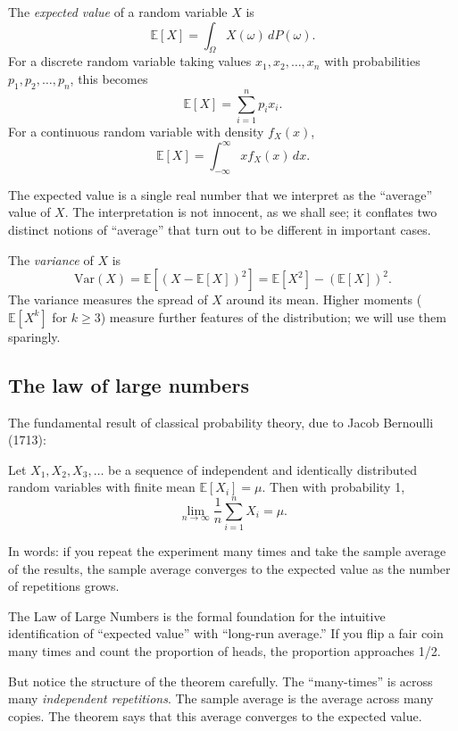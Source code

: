 The \emph{expected value} of a random variable $X$ is
\[
    \mathbb{E}[X] = \int_\Omega X(\omega)\, dP(\omega).
\]
For a discrete random variable taking values $x_1, x_2, \dots, x_n$
with probabilities $p_1, p_2, \dots, p_n$, this becomes
\[
    \mathbb{E}[X] = \sum_{i=1}^n p_i x_i.
\]
For a continuous random variable with density $f_X(x)$,
\[
    \mathbb{E}[X] = \int_{-\infty}^\infty x f_X(x)\, dx.
\]

The expected value is a single real number that we interpret as the
``average'' value of $X$. The interpretation is not innocent, as we
shall see; it conflates two distinct notions of ``average'' that
turn out to be different in important cases.

The \emph{variance} of $X$ is
\[
    \text{Var}(X) = \mathbb{E}[(X - \mathbb{E}[X])^2] =
    \mathbb{E}[X^2] - (\mathbb{E}[X])^2.
\]
The variance measures the spread of $X$ around its mean. Higher
moments ($\mathbb{E}[X^k]$ for $k \geq 3$) measure further features
of the distribution; we will use them sparingly.

\subsection{The law of large numbers}

The fundamental result of classical probability theory, due to Jacob
Bernoulli (1713):

\begin{theorem}
\label{thm:lln}
Let $X_1, X_2, X_3, \dots$ be a sequence of independent and
identically distributed random variables with finite mean
$\mathbb{E}[X_i] = \mu$. Then with probability 1,
\[
    \lim_{n \to \infty} \frac{1}{n} \sum_{i=1}^n X_i = \mu.
\]
\end{theorem}

In words: if you repeat the experiment many times and take the
sample average of the results, the sample average converges to the
expected value as the number of repetitions grows.

The Law of Large Numbers is the formal foundation for the intuitive
identification of ``expected value'' with ``long-run average.'' If
you flip a fair coin many times and count the proportion of heads,
the proportion approaches 1/2.

But notice the structure of the theorem carefully. The
``many-times'' is across many \emph{independent repetitions}. The
sample average is the average across many copies. The theorem says
that this average converges to the expected value.

